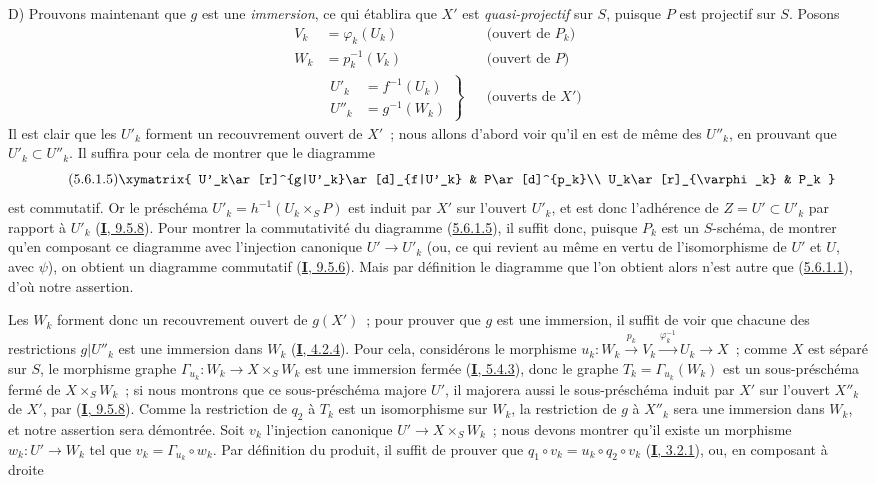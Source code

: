 D) Prouvons maintenant que $g$ est une \emph{immersion}, ce qui établira que $X'$ est
\emph{quasi-projectif} sur $S$, puisque $P$ est projectif sur $S$. Posons
\begin{align*}
V_k&=\varphi_k(U_k) &&\text{(ouvert de $P_k$)}\\
W_k&=p_k^{-1}(V_k) &&\text{(ouvert de $P$)}\\
&\left.\begin{aligned}U'_k&=f^{-1}(U_k)\\U''_k&=g^{-1}(W_k)\end{aligned}\right\}
&&\text{(ouverts de $X'$)}
\end{align*}
Il est clair que les $U'_k$ forment un recouvrement ouvert de $X'$~; nous
allons d'abord voir qu'il en est de même des $U''_k$, en prouvant que
$U'_k\subset U''_k$. Il suffira pour cela de montrer que le diagramme
\[
\tag{5.6.1.5}
\label{II.5.6.1.5-fr}
\xymatrix{
U'_k\ar[r]^{g|U'_k}\ar[d]_{f|U'_k} & P\ar[d]^{p_k}\\
U_k\ar[r]_{\varphi_k} & P_k
}
\]
est commutatif. Or le préschéma $U'_k=h^{-1}(U_k\times_SP)$ est induit par
$X'$ sur l'ouvert $U'_k$, et est donc l'adhérence de $Z=U'\subset U'_k$ par
rapport à $U'_k$ (\hyperref[I.9.5.8-fr]{\textbf{I}, 9.5.8}). Pour montrer la
commutativité du diagramme (\hyperref[II.5.6.1.5-fr]{5.6.1.5}), il suffit
donc, puisque $P_k$ est un $S$-schéma, de montrer qu'en composant ce diagramme
avec l'injection canonique $U'\to U'_k$ (ou, ce qui revient au même en vertu de
l'isomorphisme de $U'$ et $U$, avec $\psi$), on obtient un diagramme commutatif
(\hyperref[I.9.5.6-fr]{\textbf{I}, 9.5.6}). Mais par définition le diagramme que l'on
obtient alors n'est autre que (\hyperref[II.5.6.1.1-fr]{5.6.1.1}), d'où notre
assertion.

Les $W_k$ forment donc un recouvrement ouvert de $g(X')$~; pour prouver que
$g$ est une immersion, il suffit de voir que chacune des restrictions
$g|U''_k$ est une immersion dans $W_k$
(\hyperref[I.4.2.4-fr]{\textbf{I}, 4.2.4}). Pour cela, considérons le morphisme
$u_k:W_k\xrightarrow{p_k}V_k\xrightarrow{\varphi_k^{-1}}U_k\to X$~; comme
$X$ est séparé sur $S$, le morphisme graphe
$\Gamma_{u_k}:W_k\to X\times_SW_k$ est une immersion fermée
(\hyperref[I.5.4.3-fr]{\textbf{I}, 5.4.3}), donc le graphe
$T_k=\Gamma_{u_k}(W_k)$ est un sous-préschéma fermé de $X\times_SW_k$~; si
nous montrons que ce sous-préschéma majore $U'$, il majorera aussi le
sous-préschéma induit par $X'$ sur l'ouvert $X''_k$ de $X'$, par
(\hyperref[I.9.5.8-fr]{\textbf{I}, 9.5.8}). Comme la restriction de $q_2$ à $T_k$ est
un isomorphisme sur $W_k$, la restriction de $g$ à $X''_k$ sera une immersion
dans $W_k$, et notre assertion sera démontrée. Soit $v_k$ l'injection
canonique $U'\to X\times_SW_k$~; nous devons montrer qu'il existe un morphisme
$w_k:U'\to W_k$ tel que $v_k=\Gamma_{u_k}\circ w_k$. Par définition du
produit, il suffit de prouver que
$q_1\circ v_k=u_k\circ q_2\circ v_k$
(\hyperref[I.3.2.1-fr]{\textbf{I}, 3.2.1}), ou, en composant à droite

